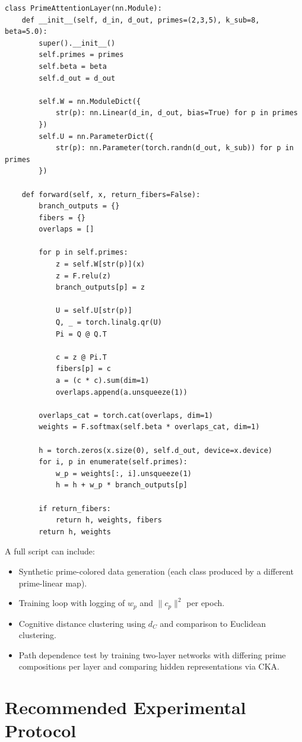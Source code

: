 \documentclass[11pt]{article}
\begin{document}
\begin{verbatim}
class PrimeAttentionLayer(nn.Module):
    def __init__(self, d_in, d_out, primes=(2,3,5), k_sub=8, beta=5.0):
        super().__init__()
        self.primes = primes
        self.beta = beta
        self.d_out = d_out

        self.W = nn.ModuleDict({
            str(p): nn.Linear(d_in, d_out, bias=True) for p in primes
        })
        self.U = nn.ParameterDict({
            str(p): nn.Parameter(torch.randn(d_out, k_sub)) for p in primes
        })

    def forward(self, x, return_fibers=False):
        branch_outputs = {}
        fibers = {}
        overlaps = []

        for p in self.primes:
            z = self.W[str(p)](x)
            z = F.relu(z)
            branch_outputs[p] = z

            U = self.U[str(p)]
            Q, _ = torch.linalg.qr(U)
            Pi = Q @ Q.T

            c = z @ Pi.T
            fibers[p] = c
            a = (c * c).sum(dim=1)
            overlaps.append(a.unsqueeze(1))

        overlaps_cat = torch.cat(overlaps, dim=1)
        weights = F.softmax(self.beta * overlaps_cat, dim=1)

        h = torch.zeros(x.size(0), self.d_out, device=x.device)
        for i, p in enumerate(self.primes):
            w_p = weights[:, i].unsqueeze(1)
            h = h + w_p * branch_outputs[p]

        if return_fibers:
            return h, weights, fibers
        return h, weights
\end{verbatim}

A full script can include:

\begin{itemize}[nosep]
  \item Synthetic prime-colored data generation (each class produced by a different prime-linear map).
  \item Training loop with logging of $w_p$ and $\|c_p\|^2$ per epoch.
  \item Cognitive distance clustering using $d_C$ and comparison to Euclidean clustering.
  \item Path dependence test by training two-layer networks with differing prime compositions per layer and comparing hidden representations via CKA.
\end{itemize}

\section{Recommended Experimental Protocol}
\end{document}
